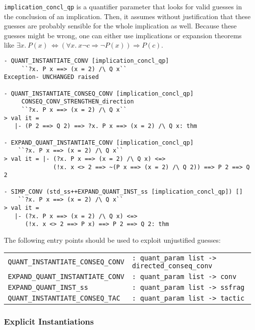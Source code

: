 \texttt{implication\_concl\_qp} is a quantifier parameter that looks for valid guesses in the conclusion of an implication.
Then, it assumes without justification that these guesses are probably sensible for the whole implication as well.
Because these guesses might be wrong, one can either use implications or
expansion theorems like $\exists x.\ P(x)\ \Longleftrightarrow (\forall x.\ x \neg c \Rightarrow \neg P(x)) \Rightarrow P(c)$.

\begin{session}
\begin{verbatim}
- QUANT_INSTANTIATE_CONV [implication_concl_qp]
     ``?x. P x ==> (x = 2) /\ Q x``
Exception- UNCHANGED raised

- QUANT_INSTANTIATE_CONSEQ_CONV [implication_concl_qp]
     CONSEQ_CONV_STRENGTHEN_direction
     ``?x. P x ==> (x = 2) /\ Q x``
> val it =
   |- (P 2 ==> Q 2) ==> ?x. P x ==> (x = 2) /\ Q x: thm

- EXPAND_QUANT_INSTANTIATE_CONV [implication_concl_qp]
    ``?x. P x ==> (x = 2) /\ Q x``
> val it = |- (?x. P x ==> (x = 2) /\ Q x) <=>
              (!x. x <> 2 ==> ~(P x ==> (x = 2) /\ Q 2)) ==> P 2 ==> Q 2

- SIMP_CONV (std_ss++EXPAND_QUANT_INST_ss [implication_concl_qp]) []
    ``?x. P x ==> (x = 2) /\ Q x``
> val it =
   |- (?x. P x ==> (x = 2) /\ Q x) <=>
      (!x. x <> 2 ==> P x) ==> P 2 ==> Q 2: thm
\end{verbatim}
\end{session}

The following entry points should be used to exploit unjustified guesses:
\bigskip

\noindent
\begin{tabular}{@{}ll}
\texttt{QUANT\_INSTANTIATE\_CONSEQ\_CONV} & \texttt{: quant\_param list -> directed\_conseq\_conv} \\
\texttt{EXPAND\_QUANT\_INSTANTIATE\_CONV} & \texttt{: quant\_param list -> conv} \\
\texttt{EXPAND\_QUANT\_INST\_ss} & \texttt{: quant\_param list -> ssfrag} \\
\texttt{QUANT\_INSTANTIATE\_CONSEQ\_TAC} & \texttt{: quant\_param list -> tactic}
\end{tabular}


\subsubsection{Explicit Instantiations}


